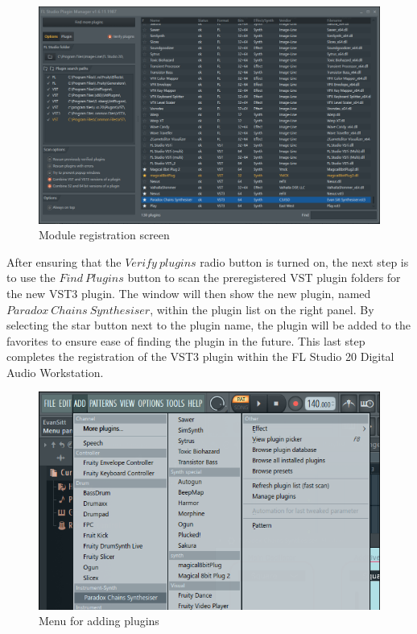 \documentclass[a4paper,12pt]{report}
\begin{document}
\begin{figure} \centering
\includegraphics[width=36em]{ModuleRegistration.png}
    \caption{Module registration screen}     \label{fig:modulereg} \end{figure}

After ensuring that the $Verify\ plugins$ radio button is turned on, the next step is to use the $Find\ Plugins$ button to scan the preregistered VST plugin folders for the new VST3 plugin. The window will then show the new plugin, named $Paradox\ Chains\ Synthesiser$, within the plugin list on the right panel. By selecting the star button next to the plugin name, the plugin will be added to the favorites to ensure ease of finding the plugin in the future. This last step completes the registration of the VST3 plugin within the FL Studio 20 Digital Audio Workstation.

\begin{figure} \centering
\includegraphics[width=32em]{AddPluginList.png}
    \caption{Menu for adding plugins}     \label{fig:addplugin} \end{figure}
\end{document}
